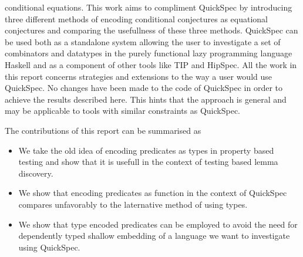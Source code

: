 conditional equations.
This work aims to compliment QuickSpec by introducing three different methods
of encoding conditional conjectures as equational conjectures and comparing
the usefullness of these three methods. QuickSpec can be used both as a standalone
system allowing the user to investigate a set of combinators and datatypes in the
purely functional lazy programming language Haskell and as a component of other tools %
like TIP\cite{Rosen2015} and HipSpec\cite{Claessen2013}. 
All the work in this report concerns strategies and extensions to the way a user would
use QuickSpec. No changes have been made to the code of QuickSpec in order to
achieve the results described here. This hints that the approach is general
and may be applicable to tools with similar constraints as QuickSpec.

The contributions of this report can be summarised as
\begin{itemize}
    \item We take the old idea of encoding predicates as types
        in property based testing and show that it is usefull in
        the context of testing based lemma discovery.

    \item We show that encoding predicates as function in the context
        of QuickSpec compares unfavorably to the laternative method
        of using types.

    \item We show that type encoded predicates can be employed to avoid 
        the need for dependently typed shallow embedding of a language
        we want to investigate using QuickSpec.
\end{itemize}

